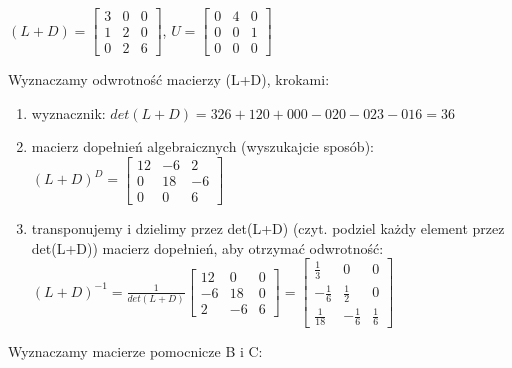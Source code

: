 \documentclass{article}
\begin{document}
$(L+D) = \begin{bmatrix}3&0&0\\1&2&0\\0&2&6\end{bmatrix}$,
$U = \begin{bmatrix}0&4&0\\0&0&1\\0&0&0\end{bmatrix}$

Wyznaczamy odwrotność macierzy (L+D), krokami:
\begin{enumerate}
    \item wyznacznik: $det(L+D) = 326 + 120 + 000 - 020-023-016 = 36$ 
    \item macierz dopełnień algebraicznych (wyszukajcie sposób):
$ (L+D)^D = 
\begin{bmatrix}
    12 & -6 & 2 \\
    0 & 18 & -6 \\
    0 & 0 & 6
\end{bmatrix}
$
    \item transponujemy i dzielimy przez det(L+D) (czyt. podziel każdy element przez det(L+D)) macierz dopełnień, aby otrzymać odwrotność:
$
(L+D)^{-1} = \frac{1}{det(L+D)}
\begin{bmatrix}
    12 & 0 & 0 \\
    -6 & 18 & 0 \\
    2 & -6 & 6
\end{bmatrix}
=
\begin{bmatrix}
    \frac{1}{3} & 0 & 0 \\
    -\frac{1}{6} & \frac{1}{2} & 0 \\
    \frac{1}{18} & -\frac{1}{6} & \frac{1}{6}
\end{bmatrix}
$
\end{enumerate}
Wyznaczamy macierze pomocnicze B i C:
\end{document}
